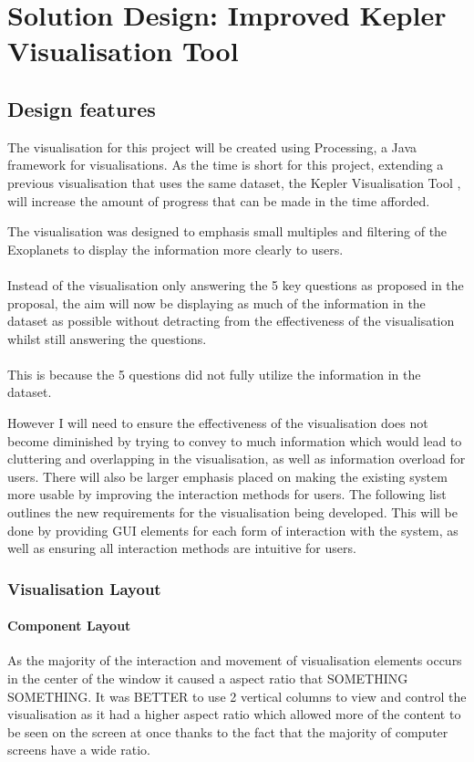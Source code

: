 \chapter{Solution Design: Improved Kepler Visualisation Tool}\label{C:sd}

\section{Design features}

The visualisation for this project will be created using Processing, a Java framework for visualisations. As the time is short for this project, extending a previous visualisation that uses the same dataset, the Kepler Visualisation Tool \cite{kepler_github, kepler_article}, will increase the amount of progress that can be made in the time afforded.

The visualisation was designed to emphasis small multiples and filtering of the Exoplanets to display the information more clearly to users. 
\\\\
Instead of the visualisation only answering the 5 key questions as proposed in the proposal, the aim will now be displaying as much of the information in the dataset as possible without detracting from the effectiveness of the visualisation whilst still answering the questions. 
\\\\
This is because the 5 questions did not fully utilize the information in the dataset. 

However I will need to ensure the effectiveness of the visualisation does not become diminished by trying to convey to much information which would lead to cluttering and overlapping in the visualisation, as well as information overload for users. There will also be larger emphasis placed on making the existing system more usable by improving the interaction methods for users. The following list outlines the new requirements for the visualisation being developed. This will be done by 
providing GUI elements for each form of interaction with the system, as well as ensuring all interaction methods are intuitive for users. 
\subsection{Visualisation Layout}
\subsubsection{Component Layout}
As the majority of the interaction and movement of visualisation elements occurs in the center of the window it caused a aspect ratio that SOMETHING SOMETHING. It was BETTER to use 2 vertical columns to view and control the visualisation as it had a higher aspect ratio which allowed more of the content to be seen on the screen at once thanks to the fact that the majority of computer screens have a wide ratio.

